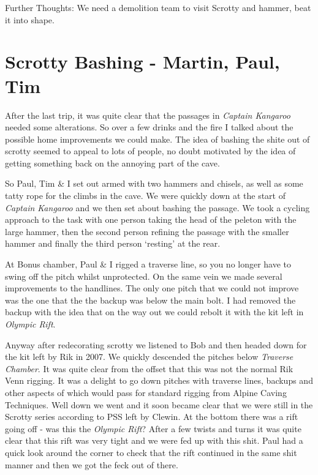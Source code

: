 Further Thoughts: We need a demolition team to visit Scrotty and hammer,
beat it into shape.


\hypertarget{scrotty-bashing---martin-paul-tim}{%
\section{Scrotty Bashing - Martin, Paul,
Tim}\label{scrotty-bashing---martin-paul-tim}}

After the last trip, it was quite clear that the passages in
\emph{Captain Kangaroo} needed some alterations. So over a few drinks
and the fire I talked about the possible home improvements we could
make. The idea of bashing the shite out of scrotty seemed to appeal to
lots of people, no doubt motivated by the idea of getting something back
on the annoying part of the cave.

So Paul, Tim \& I set out armed with two hammers and chisels, as well as
some tatty rope for the climbs in the cave. We were quickly down at the
start of \emph{Captain Kangaroo} and we then set about bashing the
passage. We took a cycling approach to the task with one person taking
the head of the peleton with the large hammer, then the second person
refining the passage with the smaller hammer and finally the third
person `resting' at the rear.

At Bonus chamber, Paul \& I rigged a traverse line, so you no longer
have to swing off the pitch whilst unprotected. On the same vein we made
several improvements to the handlines. The only one pitch that we could
not improve was the one that the the backup was below the main bolt. I
had removed the backup with the idea that on the way out we could rebolt
it with the kit left in \emph{Olympic Rift}.

Anyway after redecorating scrotty we listened to Bob and then headed
down for the kit left by Rik in 2007. We quickly descended the pitches
below \emph{Traverse Chamber}. It was quite clear from the offset that
this was not the normal Rik Venn rigging. It was a delight to go down
pitches with traverse lines, backups and other aspects of which would
pass for standard rigging from Alpine Caving Techniques. Well down we
went and it soon became clear that we were still in the Scrotty series
according to PSS left by Clewin. At the bottom there was a rift going
off - was this the \emph{Olympic Rift}? After a few twists and turns it
was quite clear that this rift was very tight and we were fed up with
this shit. Paul had a quick look around the corner to check that the
rift continued in the same shit manner and then we got the feck out of
there.

